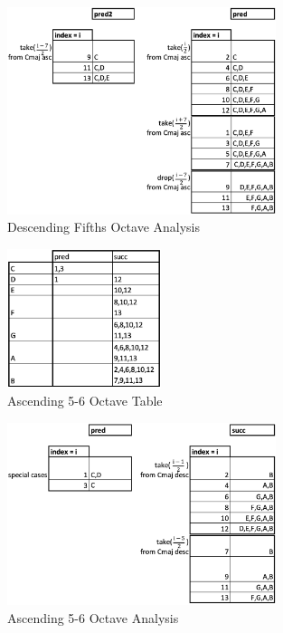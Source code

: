 \documentclass{report}
\begin{document}
\begin{figure}[h!]
\centering
\includegraphics[width=0.7\textwidth]{images/desc_fifths_octave_analysis}
  \caption{Descending Fifths Octave Analysis}
\end{figure}


\begin{figure}[h!]
\centering
\includegraphics[width=0.4\textwidth]{images/asc56_octave_grid}
  \caption{Ascending 5-6 Octave Table}
\end{figure}

\begin{figure}[h!]
\centering
\includegraphics[width=0.7\textwidth]{images/asc56_octave_analysis}
  \caption{Ascending 5-6 Octave Analysis}
\end{figure}
\end{document}
